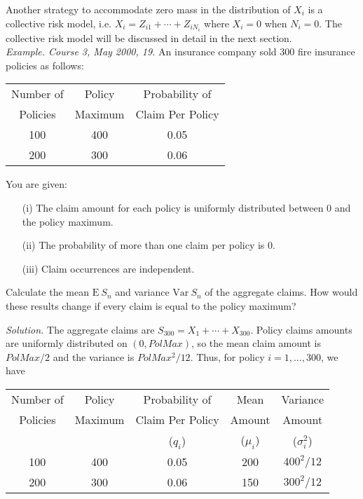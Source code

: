 \documentclass[12pt,letterpaper]{article}
\begin{document}
Another strategy to accommodate zero mass in the distribution of $X_i$ is a collective risk model, i.e. $X_i=Z_{i1}+\cdots+Z_{iN_i}$ where $X_i=0$ when $N_i=0$. The collective risk model will be discussed in detail in the next section. \\



\noindent \textit{Example. Course 3, May 2000, 19.} An insurance company sold 300 fire insurance policies as follows:
\bigskip
\begin{center}
	\begin{tabular}{c c c} \hline
		Number of & Policy & Probability of\\
		Policies &  Maximum &  Claim Per Policy\\ \hline
		100 & 400 & 0.05\\
		200 & 300 & 0.06\\ \hline
	\end{tabular}
\end{center}
\bigskip
You are given:
\begin{enumerate}
	\item[(i)] The claim amount for each policy is uniformly distributed between $0$ and the policy maximum.
	\item[(ii)] The probability of more than one claim per policy is $0$.
	\item[(iii)] Claim occurrences are independent.
\end{enumerate}

\noindent Calculate the mean $\mathrm{E~}S_n$ and variance $\mathrm{Var~}S_n$ of the aggregate claims. How would these results change if every claim is equal to the policy maximum?

\bigskip

\noindent \textit{Solution.} The aggregate claims are $S_{300} = X_1+\cdots
+X_{300}$. Policy claims amounts are uniformly distributed on $(0,
PolMax)$, so the mean claim amount is $PolMax/2$ and the variance is
$PolMax^2/12$. Thus, for policy $i=1,...,300$, we have
\begin{center}
	\begin{tabular}{c c ccc} \hline
		Number of & Policy & Probability of & Mean& Variance\\
		Policies &  Maximum &  Claim Per Policy& Amount & Amount\\
		& & ($q_i$) & ($\mu_i$) & ($\sigma_i^2$) \\ \hline
		100 & 400 & 0.05 & 200 & $400^2/12$\\
		200 & 300 & 0.06 & 150 & $300^2/12$ \\ \hline
	\end{tabular}
\end{center}
\end{document}
